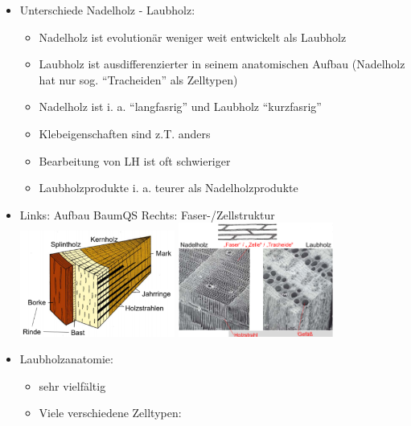 \documentclass[fleqn,twoside]{article}
\begin{document}
        \begin{itemize}
            \item Unterschiede Nadelholz - Laubholz:
                \begin{itemize}
                    \item Nadelholz ist evolutionär weniger weit entwickelt als Laubholz
                    \item Laubholz ist ausdifferenzierter in seinem anatomischen Aufbau (Nadelholz hat nur sog. \enquote{Tracheiden} als Zelltypen)
                    \item Nadelholz ist i. a. \enquote{langfasrig} und Laubholz \enquote{kurzfasrig}
                    \item Klebeigenschaften sind z.T. anders
                    \item Bearbeitung von LH ist oft schwieriger
                    \item Laubholzprodukte i. a. teurer als Nadelholzprodukte
                \end{itemize}
             \newpage   
            \item Links: Aufbau BaumQS Rechts: Faser-/Zellstruktur\\
                \includegraphics[width=0.4\textwidth]{Grafiken/Laubholz/BaumQS.png}
                \includegraphics[width=0.4\textwidth]{Grafiken/Laubholz/Zellstruktur.png}\\
            \item Laubholzanatomie:
                \begin{itemize}
                    \item sehr vielfältig
                    \item Viele verschiedene Zelltypen:

\end{itemize}
\end{itemize}
\end{document}

